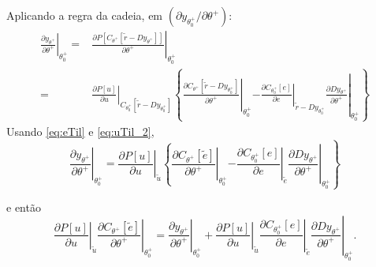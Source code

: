 Aplicando a regra da cadeia, em $(\partial y_{\theta_0^+}/\partial \theta^+)$:
\begin{align}
\left.\frac{\partial y_{\theta^{+}}}{\partial \theta^{+}}\right|_{\theta_{0}^{+}}=&\left.\frac{\partial P\left[C_{\theta^{+}}\left[\tilde{r}-D y_{\theta^{+}}\right]\right]}{\partial \theta^{+}}\right|_{\theta_{0}^{+}} \\
=&\left.\frac{\partial P[u]}{\partial u}\right|_{C_{\theta_{0}^{+}}\left[\tilde{r}-D y_{\theta_{0}^{+}}\right]} 
   \left\{\left.\left.\frac{\partial C_{\theta^{+}}\left[\tilde{r}-D y_{\theta_{0}^{+}}\right]}{\partial \theta^{+}}\right|_{\theta_{0}^{+}}{-\left.\frac{\partial C_{\theta_{0}^{+}}[e]}{\partial e}\right|_{\tilde{r}-D y_{\theta_{0}^{+}}}} \frac{\partial D y_{\theta^{+}}}{\partial \theta^{+}}\right|_{\theta_{0}^{+}}\right\}
\end{align}
%
Usando \eqref{eq:eTil} e \eqref{eq:uTil_2},
\begin{equation}
   \left.\frac{\partial y_{\theta^{+}}}{\partial \theta^{+}}\right|_{\theta_{0}^{+}}=\left.\frac{\partial P[u]}{\partial u}\right|_{\tilde{u}}\left\{\left.\frac{\partial C_{\theta^{+}}[\tilde{e}]}{\partial \theta^{+}}\right|_{\theta_{0}^{+}}\right.
   \left.-\left.\left.\frac{\partial C_{\theta_{0}^{+}}[e]}{\partial e}\right|_{\tilde{e}} \frac{\partial D y_{\theta^{+}}}{\partial \theta^{+}}\right|_{\theta_{0}^{+}}\right\}
\end{equation}


e então
\begin{equation}
   \left.\left.\frac{\partial P[u]}{\partial u}\right|_{\tilde{u}} \frac{\partial C_{\theta^{+}}[\tilde{e}]}{\partial \theta^{+}}\right|_{\theta_{0}^{+}}
   =
   \left.\frac{\partial y_{\theta^{+}}}{\partial \theta^{+}}\right|_{\theta_{0}^{+}}+\left.\left.\left.\frac{\partial P[u]}{\partial u}\right|_{\tilde{u}} \frac{\partial C_{\theta_{0}^{+}}[e]}{\partial e}\right|_{\tilde{e}} \frac{\partial D y_{\theta^{+}}}{\partial \theta^{+}}\right|_{\theta_{0}^{+}}.
\end{equation}

